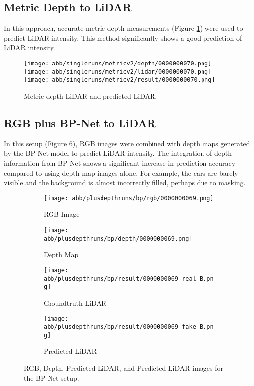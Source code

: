 \subsection{Metric Depth to LiDAR}
In this approach, accurate metric depth measurements (Figure \ref{metric_results}) were used to predict LiDAR intensity. This method significantly shows a good prediction of LiDAR intensity.
\begin{figure}[!ht]
	\centering
	\texttt{[image: abb/singleruns/metricv2/depth/0000000070.png]}
	\texttt{[image: abb/singleruns/metricv2/lidar/0000000070.png]}
	\texttt{[image: abb/singleruns/metricv2/result/0000000070.png]}
	\caption{Metric depth LiDAR and predicted LiDAR.}
	\label{metric_results}
\end{figure}
\newpage	
\subsection{RGB plus BP-Net to LiDAR}
In this setup (Figure \ref{bp_rgbd}), RGB images were combined with depth maps generated by the BP-Net model to predict LiDAR intensity. The integration of depth information from BP-Net shows a significant increase in prediction accuracy compared to using depth map images alone. For example, the cars are barely visible and the background is almost incorrectly filled, perhaps due to masking.
\begin{figure}[!ht]
	\centering
	\begin{subfigure}{0.4\textwidth}
		\centering
		\texttt{[image: abb/plusdepthruns/bp/rgb/0000000069.png]}
		\caption{RGB Image}
		\label{bp_rgbd1}
	\end{subfigure}
	
	\vspace{1em} %
	
	\begin{subfigure}{0.4\textwidth}
		\centering
		\texttt{[image: abb/plusdepthruns/bp/depth/0000000069.png]}
		\caption{Depth Map}
		\label{bp_rgbd2}
	\end{subfigure}
	
	\vspace{1em} %
	
	\begin{subfigure}{0.25\textwidth}
		\centering
		\texttt{[image: abb/plusdepthruns/bp/result/0000000069\_real\_B.png]}
		\caption{Groundtruth LiDAR}
		\label{fig:bp_pred_lidar}
	\end{subfigure}
	\begin{subfigure}{0.25\textwidth}
		\centering
		\texttt{[image: abb/plusdepthruns/bp/result/0000000069\_fake\_B.png]}
		\caption{Predicted LiDAR}
		\label{fig:bp_fake_lidar}
	\end{subfigure}
	
	\caption{RGB, Depth, Predicted LiDAR, and Predicted LiDAR images for the BP-Net setup.}
	\label{bp_rgbd}
\end{figure}
\newpage

